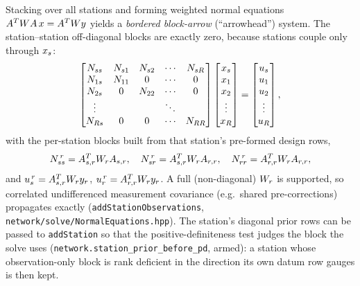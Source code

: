 \documentclass[main.tex]{subfiles}
\begin{document}
Stacking  over all stations and forming
weighted normal equations $A^{T} W A\,x =
A^{T} W y$ yields a \emph{bordered block-arrow}
(``arrowhead'') system. The station--station off-diagonal blocks are
exactly zero, because stations couple only through $x_s$:
\begin{equation}
\begin{bmatrix}
N_{ss}      & N_{s1} & N_{s2} & \cdots & N_{sR} \\
N_{1s} & N_{11} & 0      & \cdots & 0 \\
N_{2s} & 0      & N_{22} & \cdots & 0 \\
\vdots      &             &             & \ddots &        \\
N_{Rs} & 0      & 0      & \cdots & N_{RR}
\end{bmatrix}
\begin{bmatrix}
x_s \\ x_{1} \\ x_{2} \\ \vdots \\ x_{R}
\end{bmatrix}
=
\begin{bmatrix}
u_s \\ u_1 \\ u_2 \\ \vdots \\ u_R
\end{bmatrix},
\label{eq:net-arrowhead}
\end{equation}
with the per-station blocks built from that station's pre-formed design
rows,
\begin{equation}
N_{ss}^{\,r} = A_{s,r}^{T} W_r A_{s,r},
\quad
N_{sr}^{\,r} = A_{s,r}^{T} W_r A_{r,r},
\quad
N_{rr}^{\,r} = A_{r,r}^{T} W_r A_{r,r},
\label{eq:net-blocks}
\end{equation}
and $u_s^{\,r} = A_{s,r}^{T} W_r y_r$,
$u_r^{\,r} = A_{r,r}^{T} W_r y_r$. A full
(non-diagonal) $W_r$ is supported, so correlated undifferenced
measurement covariance (e.g.\ shared pre-corrections) propagates
exactly (\texttt{addStationObservations},
\texttt{network/solve/NormalEquations.hpp}). The station's diagonal prior
rows can be passed to \texttt{addStation} so that the positive-definiteness
test judges the block the solve uses
(\texttt{network.station\_prior\_before\_pd}, armed): a station whose
observation-only block is rank deficient in the direction its own datum
row gauges is then kept.
\end{document}
